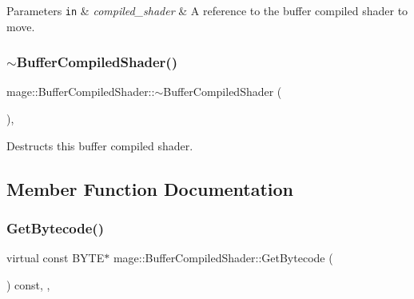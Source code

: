 \begin{DoxyParams}[1]{Parameters}
\mbox{\tt in}  & {\em compiled\+\_\+shader} & A reference to the buffer compiled shader to move. \\
\hline
\end{DoxyParams}
\hypertarget{classmage_1_1_buffer_compiled_shader_a39ca72436bfd68e14c41fead70540edc}{}\label{classmage_1_1_buffer_compiled_shader_a39ca72436bfd68e14c41fead70540edc} 
\subsubsection{\texorpdfstring{$\sim$\+Buffer\+Compiled\+Shader()}{~BufferCompiledShader()}}
{\footnotesize\ttfamily mage\+::\+Buffer\+Compiled\+Shader\+::$\sim$\+Buffer\+Compiled\+Shader (\begin{DoxyParamCaption}{ }\end{DoxyParamCaption})\hspace{0.3cm}{\ttfamily [virtual]}, {\ttfamily [default]}}

Destructs this buffer compiled shader. 

\subsection{Member Function Documentation}
\hypertarget{classmage_1_1_buffer_compiled_shader_ae6b2b4b5c9b96d7ca680724ccf0affb3}{}\label{classmage_1_1_buffer_compiled_shader_ae6b2b4b5c9b96d7ca680724ccf0affb3} 
\subsubsection{\texorpdfstring{Get\+Bytecode()}{GetBytecode()}}
{\footnotesize\ttfamily virtual const B\+Y\+TE$\ast$ mage\+::\+Buffer\+Compiled\+Shader\+::\+Get\+Bytecode (\begin{DoxyParamCaption}{ }\end{DoxyParamCaption}) const\hspace{0.3cm}{\ttfamily [override]}, {\ttfamily [virtual]}, {\ttfamily [noexcept]}}

